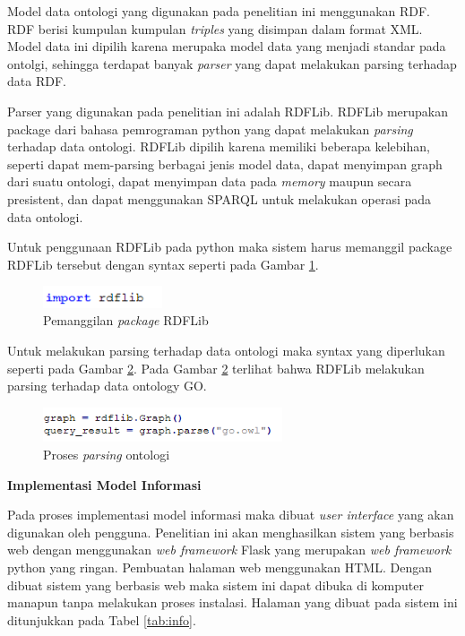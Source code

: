 Model  data ontologi yang digunakan pada penelitian ini menggunakan RDF. RDF berisi kumpulan kumpulan \textit{triples} yang disimpan dalam format XML. Model data ini dipilih karena merupaka model data yang menjadi standar pada ontolgi, sehingga terdapat banyak \textit{parser} yang dapat melakukan parsing terhadap data RDF.

Parser yang digunakan pada penelitian ini adalah RDFLib. RDFLib merupakan package dari bahasa pemrograman python yang dapat melakukan \textit{parsing} terhadap data ontologi.  RDFLib dipilih karena memiliki beberapa kelebihan, seperti dapat mem-parsing berbagai jenis model data, dapat menyimpan graph dari suatu ontologi, dapat menyimpan data pada \textit{memory} maupun secara presistent, dan dapat menggunakan SPARQL untuk melakukan operasi pada data ontologi.

Untuk penggunaan RDFLib pada python maka sistem harus memanggil package RDFLib tersebut dengan syntax seperti pada Gambar \ref{fig:import}.

\begin{figure}[h!] %
	\centering
	\includegraphics[width=100pt]{import.png}
	\caption{Pemanggilan \textit{package} RDFLib}
	\label{fig:import}
\end{figure}

Untuk melakukan parsing terhadap data ontologi maka syntax yang diperlukan seperti pada Gambar \ref{fig:parsing}. Pada Gambar \ref{fig:parsing} terlihat bahwa RDFLib melakukan parsing terhadap data ontology GO.

\begin{figure}[h!] %
	\centering
	\includegraphics[width=200pt]{parsing.png}
	\caption{Proses \textit{parsing} ontologi}
	\label{fig:parsing}
\end{figure}

\begin{flushleft}
	\textbf{Implementasi Model Informasi}
\end{flushleft}

Pada proses implementasi model informasi maka dibuat \textit{user interface} yang akan digunakan oleh pengguna. Penelitian ini akan menghasilkan sistem yang berbasis web dengan menggunakan \textit{web framework} Flask yang merupakan \textit{web framework} python yang ringan. Pembuatan halaman web menggunakan HTML. Dengan dibuat sistem yang berbasis web maka sistem ini dapat dibuka di komputer manapun tanpa melakukan proses instalasi. Halaman yang dibuat pada sistem ini ditunjukkan pada Tabel \ref{tab:info}.

